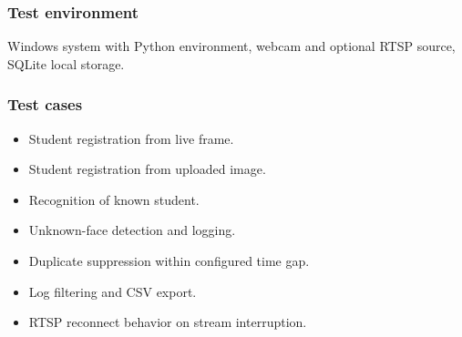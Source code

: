 \documentclass{fisatprojectfinal}
\begin{document}
\subsubsection*{Test environment}
Windows system with Python environment, webcam and optional RTSP source, SQLite local storage.

\subsubsection*{Test cases}
\begin{itemize}
	\item Student registration from live frame.
	\item Student registration from uploaded image.
	\item Recognition of known student.
	\item Unknown-face detection and logging.
	\item Duplicate suppression within configured time gap.
	\item Log filtering and CSV export.
	\item RTSP reconnect behavior on stream interruption.
\end{itemize}
\end{document}
